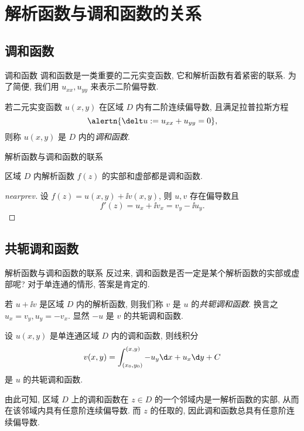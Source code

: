 \section{解析函数与调和函数的关系}


\subsection{调和函数}

\begin{frame}{调和函数}
	\onslide<+->
	调和函数是一类重要的二元实变函数, 它和解析函数有着紧密的联系.
	\onslide<+->
	为了简便, 我们用 $u_{xx},u_{yy}$ 来表示二阶偏导数.
	\onslide<+->
	\begin{definition}
		若二元实变函数 $u(x,y)$ 在区域 $D$ 内有二阶连续偏导数, 且满足拉普拉斯方程
		\[
			\alertn{\delt u:=u_{xx}+u_{yy}=0},
		\]
		则称 $u(x,y)$ 是 $D$ 内的\emph{调和函数}.
	\end{definition}
\end{frame}


\begin{frame}{解析函数与调和函数的联系}
	\onslide<+->
	\begin{theorem}[nearnext]
		区域 $D$ 内解析函数 $f(z)$ 的实部和虚部都是调和函数.
	\end{theorem}
	\onslide<+->
	\begin{proof}[nearprev]
		设 $f(z)=u(x,y)+\ii v(x,y)$, 则 $u,v$ 存在偏导数且
		\[
			f'(z)=u_x+\ii v_x=v_y-\ii u_y.
		\]
		\onslide<+->{%
			\[
				\delt v=v_{xx}+v_{yy}=-u_{yx}+u_{xy}=0.\qedhere
			\]
		}\bigdel
	\end{proof}
\end{frame}


\subsection{共轭调和函数}
\begin{frame}{解析函数与调和函数的联系}
	\onslide<+->
	反过来, 调和函数是否一定是某个解析函数的实部或虚部呢?
	\onslide<+->
	对于单连通的情形, 答案是肯定的.

	\onslide<+->
	若 $u+\ii v$ 是区域 $D$ 内的解析函数, 则我们称 $v$ 是 $u$ 的\emph{共轭调和函数}.
	\onslide<+->
	换言之 $u_x=v_y,u_y=-v_x$.
	\onslide<+->
	显然 $-u$ 是 $v$ 的共轭调和函数.
	\onslide<+->
	\begin{theorem}
		设 $u(x,y)$ 是单连通区域 $D$ 内的调和函数, 则线积分
	\[
		v(x,y)=\int_{(x_0,y_0)}^{(x,y)}-u_y\d x+u_x\d y+C
	\]
		是 $u$ 的共轭调和函数.
	\end{theorem}
	\onslide<+->
	由此可知, 区域 $D$ 上的调和函数在 $z\in D$ 的一个邻域内是一解析函数的实部, 从而在该邻域内具有任意阶连续偏导数.
	\onslide<+->
	而 $z$ 的任取的, 因此调和函数总具有任意阶连续偏导数.
\end{frame}


